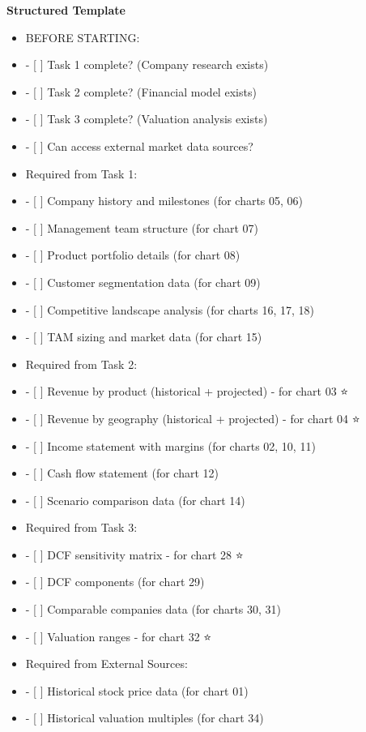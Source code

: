 \documentclass[11pt]{article}
\begin{document}
\textbf{Structured Template}
\begin{itemize}[leftmargin=*,itemsep=2pt,topsep=2pt]
\item {} BEFORE STARTING:
\item {} - [ ] Task 1 complete? (Company research exists)
\item {} - [ ] Task 2 complete? (Financial model exists)
\item {} - [ ] Task 3 complete? (Valuation analysis exists)
\item {} - [ ] Can access external market data sources?
\item {} Required from Task 1:
\item {} - [ ] Company history and milestones (for charts 05, 06)
\item {} - [ ] Management team structure (for chart 07)
\item {} - [ ] Product portfolio details (for chart 08)
\item {} - [ ] Customer segmentation data (for chart 09)
\item {} - [ ] Competitive landscape analysis (for charts 16, 17, 18)
\item {} - [ ] TAM sizing and market data (for chart 15)
\item {} Required from Task 2:
\item {} - [ ] Revenue by product (historical + projected) - for chart 03 ⭐
\item {} - [ ] Revenue by geography (historical + projected) - for chart 04 ⭐
\item {} - [ ] Income statement with margins (for charts 02, 10, 11)
\item {} - [ ] Cash flow statement (for chart 12)
\item {} - [ ] Scenario comparison data (for chart 14)
\item {} Required from Task 3:
\item {} - [ ] DCF sensitivity matrix - for chart 28 ⭐
\item {} - [ ] DCF components (for chart 29)
\item {} - [ ] Comparable companies data (for charts 30, 31)
\item {} - [ ] Valuation ranges - for chart 32 ⭐
\item {} Required from External Sources:
\item {} - [ ] Historical stock price data (for chart 01)
\item {} - [ ] Historical valuation multiples (for chart 34)
\end{itemize}
\end{document}
